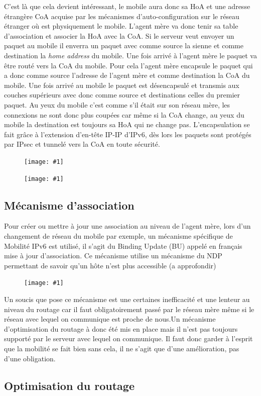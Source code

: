 \documentclass[a4paper,11pt,final]{article}
\newcommand{\scalefig}[3]{
  \begin{figure}[ht!]
    \centering
    \texttt{[image: \#1]}
    \caption{#3}
    \label{#1}
  \end{figure}}
\begin{document}
C’est là que cela devient intéressant, le mobile aura donc sa HoA et une adresse étrangère CoA acquise par les mécanismes d’auto-configuration sur le réseau étranger où est physiquement le mobile. L’agent mère va donc tenir sa table d’association et associer la HoA avec la CoA. Si le serveur veut envoyer un paquet au mobile il enverra un paquet avec comme source la sienne et comme destination la \emph{home address} du mobile. Une fois arrivé à l’agent mère le paquet va être routé vers la CoA du mobile. Pour cela l’agent mère encapsule le paquet qui a donc comme source l’adresse de l’agent mère et comme destination la CoA du mobile. Une fois arrivé au mobile le paquet est désencapsulé et transmis aux couches supérieurs avec donc comme source et destinations celles du premier paquet. Au yeux du mobile c’est comme s’il était sur son réseau mère, les connexions ne sont donc plus coupées car même si la CoA change, au yeux du mobile la destination est toujours sa HoA qui ne change pas. L’encapsulation se fait grâce à l’extension d’en-tête IP-IP d’IPv6, dès lors les paquets sont protégés par IPsec et tunnelé vers la CoA en toute sécurité.

\scalefig{images/schema3}{.7}{}
\scalefig{images/schema4}{.7}{}

\subsection{Mécanisme d’association}

Pour créer ou mettre à jour une association au niveau de l’agent mère, lors d’un changement de réseau du mobile par exemple, un mécanisme spécifique de Mobilité IPv6 est utilisé, il s’agit du Binding Update (BU) appelé en français mise à jour d’association. Ce mécanisme utilise un mécanisme du NDP permettant de savoir qu’un hôte n’est plus accessible (a approfondir)

\scalefig{images/schema5}{.7}{}

Un soucis que pose ce mécanisme est une certaines inefficacité et une lenteur au niveau du routage car il faut obligatoirement passé par le réseau mère même si le réseau avec lequel on communique est proche de nous.Un mécanisme d’optimisation du routage à donc été mis en place mais il n’est pas toujours supporté par le serveur avec lequel on communique. Il faut donc garder à l’esprit que la mobilité se fait bien sans cela, il ne s’agit que d’une amélioration, pas d’une obligation.


\subsection{Optimisation du routage}
\end{document}
